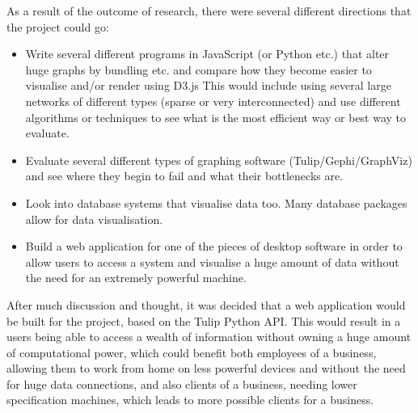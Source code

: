 \documentclass[../dissertation.tex]{subfiles}
\begin{document}
As a result of the outcome of research, there were several different directions that the project could go:

\begin{itemize}
    \item Write several different programs in JavaScript (or Python etc.) that alter huge graphs by bundling etc. and compare how they become easier to visualise and/or render using D3.js This would include using several large networks of different types (sparse or very interconnected) and use different algorithms or techniques to see what is the most efficient way or best way to evaluate.
    \item Evaluate several different types of graphing software (Tulip/Gephi/GraphViz) and see where they begin to fail and what their bottlenecks are. 
    \item Look into database systems that visualise data too. Many database packages allow for data visualisation.
    \item Build a web application for one of the pieces of desktop software in order to allow users to access a system and visualise a huge amount of data without the need for an extremely powerful machine.
\end{itemize} 

After much discussion and thought, it was decided that a web application would be built for the project, based on the Tulip Python API. This would result in a users being able to access a wealth of information without owning a huge amount of computational power, which could benefit both employees of a business, allowing them to work from home on less powerful devices and without the need for huge data connections, and also clients of a business, needing lower specification machines, which leads to more possible clients for a business.
\end{document}
